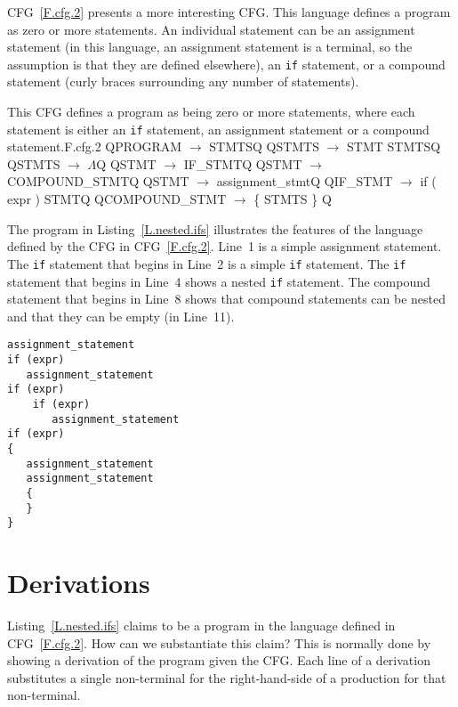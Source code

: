\documentclass[letterpaper,12pt,openany,reqno]{book}%
\newcommand{\code}[1] {\lstinline[breaklines=yes,breakatwhitespace=yes]{#1}}
\newcommand{\cfgprod}[2] {{\ttfamily #1} $\rightarrow$ {\ttfamily #2}}
\begin{document}
CFG~\ref{F.cfg.2} presents a more interesting CFG. This language defines a program as zero or more statements. An individual statement can be an assignment statement (in this language, an assignment statement is a terminal, so the assumption is that they are defined elsewhere), an \code{if} statement, or a compound statement (curly braces surrounding any number of statements). 

\begin{cfg}{This CFG defines a program as being zero or more statements, where each statement is either an \code{if} statement, an assignment statement or a compound statement.}{F.cfg.2}
Q\cfgprod{PROGRAM}{STMTS}Q
Q\cfgprod{STMTS}{STMT STMTS}Q
Q\cfgprod{STMTS}{$\Lambda$}Q
Q\cfgprod{STMT}{IF\_STMT}Q
Q\cfgprod{STMT}{COMPOUND\_STMT}Q
Q\cfgprod{STMT}{assignment\_stmt}Q
Q\cfgprod{IF\_STMT} {if ( expr ) STMT}Q
Q\cfgprod{COMPOUND\_STMT} { \{ STMTS \} }Q
\end{cfg}

The program in Listing~\ref{L.nested.ifs} illustrates the features of the language defined by the CFG in CFG~\ref{F.cfg.2}. Line~1 is a simple assignment statement. The \code{if} statement that begins in Line~2 is a simple \code{if} statement. The \code{if} statement that begins in Line~4 shows a nested \code{if} statement. The compound statement that begins in Line~8 shows that compound statements can be nested and that they can be empty (in Line~11).

\begin{lstlisting}[caption={Sample program in the language defined by the CFG in CFG~\ref{F.cfg.2}},label=L.nested.ifs]
assignment_statement
if (expr)
   assignment_statement
if (expr)
    if (expr)
       assignment_statement
if (expr)
{
   assignment_statement
   assignment_statement
   {
   }
}
\end{lstlisting}

\section{Derivations}

Listing~\ref{L.nested.ifs} claims to be a program in the language defined in CFG~\ref{F.cfg.2}. How can we substantiate this claim? This is normally done by showing a derivation of the program given the CFG. Each line of a derivation substitutes a single non-terminal for the right-hand-side of a production for that non-terminal. 
\end{document}
